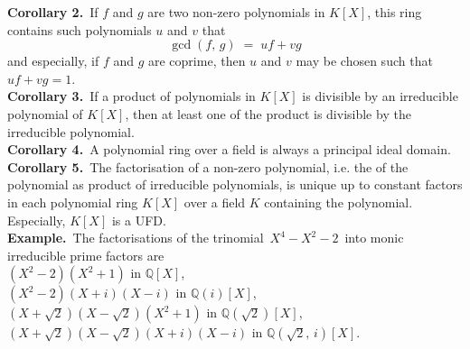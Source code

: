 \documentclass[12pt]{article}
\theoremstyle{definition}
\begin{document}
\textbf{Corollary 2.}\, If $f$ and $g$ are two non-zero polynomials in $K[X]$, this ring contains such polynomials $u$ and $v$ that
$$\gcd(f,\,g) \;=\; uf+vg$$
and especially, if $f$ and $g$ are coprime, then $u$ and $v$ may be chosen such that\, $uf+vg = 1$.\\

\textbf{Corollary 3.}\, If a product of polynomials in $K[X]$ is divisible by an irreducible polynomial of $K[X]$, then at least one  of the product is divisible by the irreducible polynomial.\\

\textbf{Corollary 4.}\, A polynomial ring over a field is always a principal ideal domain.\\

\textbf{Corollary 5.}\, The factorisation of a non-zero polynomial, i.e. the  of the polynomial as product of irreducible polynomials, is unique up to constant factors in each polynomial ring $K[X]$ over a field $K$ containing the polynomial.\, Especially, $K[X]$ is a UFD.\\

\textbf{Example.}\, The factorisations of the trinomial \,$X^4-X^2-2$\, into monic irreducible prime factors are\\
$(X^2-2)(X^2+1)$\; in\; $\mathbb{Q}[X]$,\\
$(X^2-2)(X+i)(X-i)$\; in\; $\mathbb{Q}(i)[X]$,\\
$(X+\sqrt{2})(X-\sqrt{2})(X^2+1)$\; in\; $\mathbb{Q}(\sqrt{2})[X]$,\\
$(X+\sqrt{2})(X-\sqrt{2})(X+i)(X-i)$\; in\; $\mathbb{Q}(\sqrt{2},\,i)[X]$.

\end{document}
